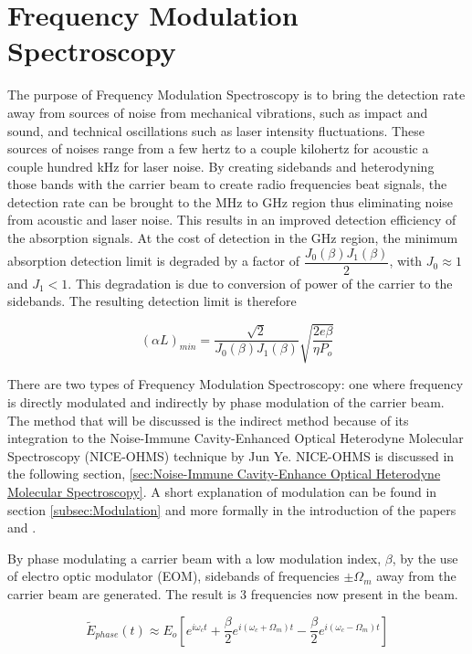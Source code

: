 \documentclass[11pt,a4paper]{book}
\begin{document}
	\section{Frequency Modulation Spectroscopy}
		\label{sec:Frequency Modulation Spectroscopy}
		The purpose of Frequency Modulation Spectroscopy is to bring the detection rate away from sources of noise from mechanical vibrations, such as impact and sound, and technical oscillations such as laser intensity fluctuations. These sources of noises range from a few hertz to a couple kilohertz for acoustic a couple hundred kHz for laser noise.  By creating sidebands and heterodyning those bands with the carrier beam to create radio frequencies beat signals, the detection rate can be brought to the MHz to GHz region thus eliminating noise from acoustic and laser noise. This results in an improved detection efficiency of the absorption signals. At the cost of detection in the GHz region, the minimum absorption detection limit is degraded by a factor of $\dfrac{J_0(\beta)J_1(\beta)}{2}$, with $J_0 \approx 1$ and $J_1 < 1 $. This degradation is due to conversion of power of the carrier to the sidebands. The resulting detection limit is therefore
		
		\begin{equation}
			\label{eq:FMSlimit}
			(\alpha L)_{min}=\dfrac{\sqrt{2}}{J_0(\beta)J_1(\beta)}\sqrt{\dfrac{2e\beta}{\eta P_o}}
		\end{equation}
		
		There are two types of Frequency Modulation Spectroscopy: one where frequency is directly modulated and indirectly by phase modulation of the carrier beam. The method that will be discussed is the indirect method because of its integration to the Noise-Immune Cavity-Enhanced Optical Heterodyne Molecular Spectroscopy (NICE-OHMS) technique by Jun Ye. NICE-OHMS is discussed in the following section, \autoref{sec:Noise-Immune Cavity-Enhance Optical Heterodyne Molecular Spectroscopy}.  A short explanation of modulation can be found in section \autoref{subsec:Modulation} and more formally in the introduction of the papers \cite{PDH Intro} and \cite{FMspec}.
		
		By phase modulating a carrier beam with a low modulation index, $\beta$, by the use of electro optic modulator (EOM), sidebands of frequencies $\pm \Omega_m $ away from the carrier beam are generated. The result is 3 frequencies now present in the beam.
		
		\begin{equation}
			\label{eq:sidebands}
			\tilde{E}_{phase}(t)\approx E_o [e^{i\omega_c t}   +   \dfrac{\beta}{2} e^{i(\omega_c +\Omega_m)t}  -  \dfrac{\beta}{2} e^{i(\omega_c -\Omega_m)t}]
		\end{equation}	
		
\end{document}
